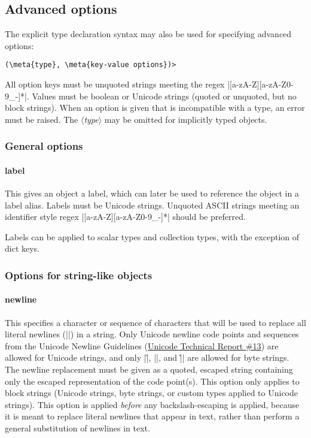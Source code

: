 \documentclass[11pt]{article}
\newcommand{\meta}[1]{\ensuremath{\langle}\textit{#1}\ensuremath{\rangle}}
\newcommand{\vmeta}[1]{{\color{DarkRed}\ensuremath{\langle}\textit{#1}\ensuremath{\rangle}}}
\begin{document}
{{\subsection{Advanced options}
\label{sec:advanced-options-and-types:options}

The explicit type declaration syntax may also be used for specifying advanced options:
\begin{Verbatim}[commandchars=\\\{\}]
(\meta{type}, \meta{key-value options})>
\end{Verbatim}
All option keys must be unquoted strings meeting the regex |[a-zA-Z][a-zA-Z0-9_-]*|.  Values must be boolean or Unicode strings (quoted or unquoted, but no block strings).  When an option is given that is incompatible with a type, an error must be raised.  The \vmeta{type} may be omitted for implicitly typed objects.


\subsubsection{General options}

\paragraph{label}
This gives an object a label, which can later be used to reference the object in a label alias.  Labels must be Unicode strings.  Unquoted ASCII strings meeting an identifier style regex |[a-zA-Z][a-zA-Z0-9_-]*| should be preferred.

Labels can be applied to scalar types and collection types, with the exception of dict keys.


\subsubsection{Options for string-like objects}

\paragraph{newline}
This specifies a character or sequence of characters that will be used to replace all literal newlines (|\n|) in a string.  Only Unicode newline code points and sequences from the Unicode Newline Guidelines (\href{http://unicode.org/standard/reports/tr13/tr13-5.html}{Unicode Technical Report \#13}) are allowed for Unicode strings, and only |\r|, |\n|, and |\r\n| are allowed for byte strings.  The newline replacement must be given as a quoted, escaped string containing only the escaped representation of the code point(s).  This option only applies to block strings (Unicode strings, byte strings, or custom types applied to Unicode strings).  This option is applied \emph{before} any backslash-escaping is applied, because it is meant to replace literal newlines that appear in text, rather than perform a general substitution of newlines in text.


}}
\end{document}
